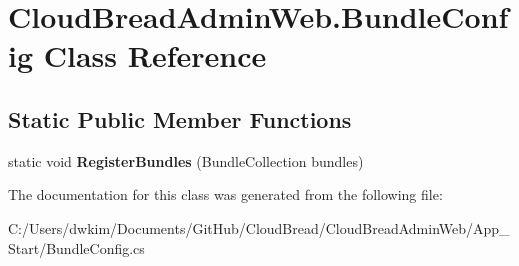\hypertarget{a00022}{}\section{Cloud\+Bread\+Admin\+Web.\+Bundle\+Config Class Reference}
\label{a00022}
\subsection*{Static Public Member Functions}
\begin{DoxyCompactItemize}
\item 
static void {\bfseries Register\+Bundles} (Bundle\+Collection bundles)\hypertarget{a00022_a9533a2d4ad40e7376c4fa62b1cf1d47d}{}\label{a00022_a9533a2d4ad40e7376c4fa62b1cf1d47d}

\end{DoxyCompactItemize}


The documentation for this class was generated from the following file\+:\begin{DoxyCompactItemize}
\item 
C\+:/\+Users/dwkim/\+Documents/\+Git\+Hub/\+Cloud\+Bread/\+Cloud\+Bread\+Admin\+Web/\+App\+\_\+\+Start/Bundle\+Config.\+cs\end{DoxyCompactItemize}
